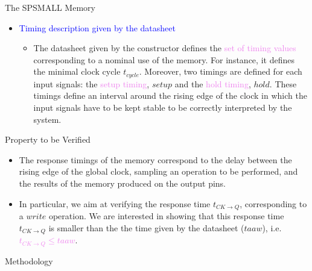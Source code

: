 \documentclass[final]{beamer}
\newcommand{\couleur}[1]{\textcolor{violet}{#1}}
\newcommand{\coulitem}[1]{\textcolor{blue}{#1}}
\begin{document}
\begin{frame}{}
\begin{columns}[t]
\begin{column}{.45\linewidth}
\begin{block}{The SPSMALL Memory}
\begin{itemize}
 
	\item \coulitem{Timing description given by the datasheet}
	\begin{itemize}
		\item The datasheet given by the constructor defines the \couleur{set of timing values} corresponding to a nominal use of the memory.
		For instance, it defines the minimal clock cycle $t_{\mathit{cycle}}$.
		Moreover, two timings are defined for each input signals: the \couleur{setup timing}, $\mathit{setup}$ and the \couleur{hold timing}, $\mathit{hold}$.
		These timings define an interval around the rising edge of the clock in which the input signals have to be kept stable to be correctly interpreted by the system.
	\end{itemize}
\end{itemize}

\end{block}



\begin{block}{Property to be Verified}

\begin{itemize}
	\item The response timings of the memory correspond to the delay between the rising edge of the global clock, sampling an operation to be performed, and the results of the memory produced on the output pins.
	\item In particular, we aim at verifying the response time $t_{\mathit{CK}\rightarrow Q}$, corresponding to a $\mathit{write}$ operation.
	We are interested in showing that this response time $t_{\mathit{CK}\rightarrow Q}$ is smaller than the the time given by the datasheet ($\mathit{taaw}$), i.e. \couleur{$t_{\mathit{CK}\rightarrow Q} \leq \mathit{taaw}$}.
\end{itemize}

\end{block}

\begin{block}{Methodology}



\end{block}
\end{column}
\end{columns}
\end{frame}
\end{document}

